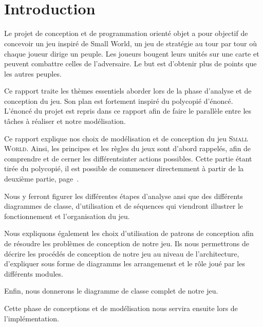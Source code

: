 \documentclass[a4paper]{article}%
\begin{document}


\newpage
\setcounter{page}{2}
~
\newpage

\tableofcontents

\newpage
~
\newpage

\section*{Introduction}

Le projet de conception et de programmation orienté objet a pour objectif de concevoir un jeu inspiré de Small World, un jeu de stratégie au tour par tour où chaque joueur dirige un peuple. Les joueurs bougent leurs unités sur une carte et peuvent combattre celles de l'adversaire. Le but est d'obtenir plus de points que les autres peuples.

\medskip

Ce rapport traite les thèmes essentiels aborder lors de la phase d'analyse et de conception du jeu. Son plan est fortement inspiré du polycopié d'énoncé. L'énoncé du projet est repris dans ce rapport afin de faire le parallèle entre les tâches à réaliser et notre modélisation. 

\medskip

Ce rapport explique nos choix de modélisation et de conception du jeu \textsc{Small World}.
Ainsi, les principes et les règles du jeux sont d'abord rappelés, afin de comprendre et de cerner les différentsinter actions possibles. Cette partie étant tirée du polycopié, il est possible de commencer directemment à partir de la deuxième partie, page~\pageref{debut}.

Nous y ferront figurer les différentes étapes d'analyse ansi que des différents diagrammes de classe, d'utilisation et de séquences qui viendront illustrer le fonctionnement et l'organisation du jeu.

Nous expliquons également les choix d'utilisation de patrons de conception afin de résoudre les problèmes de conception de notre jeu.
Ils nous permettrons de décrire les procédés de conception de notre jeu au niveau de l'architecture, d'expliquer sous forme de diagramms les arrangemenst et le rôle joué par les différents modules.

Enfin, nous donnerons le diagramme de classe complet de notre jeu.

\medskip

Cette phase de conceptions et de modélisation nous servira ensuite lors de l'implémentation.
\end{document}

